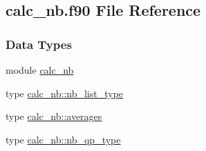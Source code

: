 \hypertarget{calc__nb_8f90}{\subsection{calc\-\_\-nb.\-f90 File Reference}
\label{calc__nb_8f90}
}
\subsubsection*{Data Types}
\begin{DoxyCompactItemize}
\item 
module \hyperlink{classcalc__nb}{calc\-\_\-nb}
\item 
type \hyperlink{structcalc__nb_1_1nb__list__type}{calc\-\_\-nb\-::nb\-\_\-list\-\_\-type}
\item 
type \hyperlink{structcalc__nb_1_1averages}{calc\-\_\-nb\-::averages}
\item 
type \hyperlink{structcalc__nb_1_1nb__qp__type}{calc\-\_\-nb\-::nb\-\_\-qp\-\_\-type}
\end{DoxyCompactItemize}
